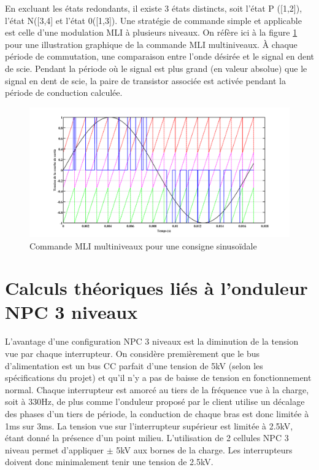 \documentclass[11pt,letterpaper,final]{report}
\begin{document}
En excluant les états redondants, il existe 3 états distincts, soit l'état P ([1,2]), l'état N([3,4] et l'état 0([1,3]). Une stratégie de commande simple et applicable est celle d'une modulation MLI à plusieurs niveaux. On réfère ici à la figure \ref{fig_MLI_ML} pour une illustration graphique de la commande MLI multiniveaux. À chaque période de commutation, une comparaison entre l'onde désirée et le signal en dent de scie. Pendant la période où le signal est plus grand (en valeur absolue) que le signal en dent de scie, la paire de transistor associée est activée pendant la période de conduction calculée. 

\begin{figure}[htb]
\centering
\includegraphics[scale=0.4]{commande_NPC_1.png}
\caption{Commande MLI multiniveaux pour une consigne sinusoïdale}
\label{fig_MLI_ML}
\end{figure}

\section{Calculs théoriques liés à l'onduleur NPC 3 niveaux}
L'avantage d'une configuration NPC 3 niveaux est la diminution de la tension vue par chaque interrupteur. On considère premièrement que le bus d'alimentation est un bus CC parfait d'une tension de 5kV (selon les spécifications du projet) et qu'il n'y a pas de baisse de tension en fonctionnement normal. Chaque interrupteur est amorcé au tiers de la fréquence vue à la charge, soit à 330Hz, de plus comme l'onduleur proposé par le client utilise un décalage des phases d'un tiers de période, la conduction de chaque bras est donc limitée à 1ms sur 3ms. La tension vue sur l'interrupteur supérieur est limitée à 2.5kV, étant donné la présence d'un point milieu. L'utilisation de 2 cellules NPC 3 niveau permet d'appliquer $\pm$ 5kV aux bornes de la charge. Les interrupteurs doivent donc minimalement tenir une tension de 2.5kV. 
\end{document}

